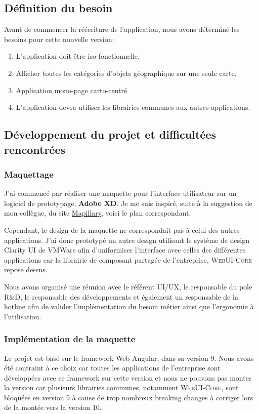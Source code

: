\documentclass{rapportUHA40}
\begin{document}
\subsection{Définition du besoin}
Avant de commencer la réécriture de l'application, nous avons déterminé les
besoins pour cette nouvelle version:
\begin{enumerate}
  \item L'application doit être iso-fonctionnelle.
  \item Afficher toutes les catégories d'objets géographique sur une seule carte.
  \item Application mono-page carto-centré
  \item L'application devra utiliser les librairies communes aux autres applications.
\end{enumerate}

\subsection{Développement du projet et difficultées rencontrées}
\subsubsection{Maquettage}
J'ai commencé par réaliser une maquette pour l'interface utilisateur sur un
logiciel de prototypage, \textbf{Adobe XD}. Je me suis inspiré, suite à la
suggestion de mon collègue, du site
\href{https://www.mapillary.com/app/}{Mapillary}, voici le plan correspondant:

Cependant, le design de la maquette ne correspondait pas à celui des autres
applications. J'ai donc prototypé un autre design utilisant le système de
design Clarity UI de VMWare afin d'uniformiser l'interface avec celles des
différentes applications car la librairie de composant partagée de
l'entreprise, \textsc{WebUI-Core} repose dessus.

Nous avons organisé une réunion avec le référent UI/UX, le responsable du pole
R\&D, le responsable des développements et également un responsable de la
hotline afin de valider l'implémentation du besoin métier ainsi que l'ergonomie
à l'utilisation.

\subsubsection{Implémentation de la maquette}
Le projet est basé sur le framework Web Angular, dans sa version 9. Nous avons
été contraint à ce choix car toutes les applications de l'entreprise sont
développées avec ce framework sur cette version et nous ne pouvons pas monter
la version car plusieurs librairies communes, notamment \textsc{WebUI-Core},
sont bloquées en version 9 à cause de trop nombreux breaking changes à corriger
lors de la montée vers la version 10.
\end{document}
